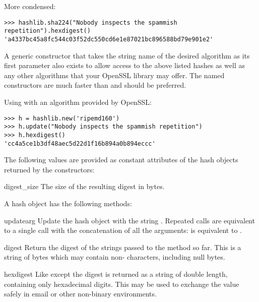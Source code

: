 More condensed:

\begin{verbatim}
>>> hashlib.sha224("Nobody inspects the spammish repetition").hexdigest()
'a4337bc45a8fc544c03f52dc550cd6e1e87021bc896588bd79e901e2'
\end{verbatim}

A generic  constructor that takes the string name of the
desired algorithm as its first parameter also exists to allow access to the
above listed hashes as well as any other algorithms that your OpenSSL library
may offer.  The named constructors are much faster than  and
should be preferred.

Using  with an algorithm provided by OpenSSL:

\begin{verbatim}
>>> h = hashlib.new('ripemd160')
>>> h.update("Nobody inspects the spammish repetition")
>>> h.hexdigest()
'cc4a5ce1b3df48aec5d22d1f16b894a0b894eccc'
\end{verbatim}

The following values are provided as constant attributes of the hash objects
returned by the constructors:

\begin{datadesc}{digest_size}
  The size of the resulting digest in bytes.
\end{datadesc}

A hash object has the following methods:

\begin{methoddesc}[hash]{update}{arg}
Update the hash object with the string .  Repeated calls are
equivalent to a single call with the concatenation of all the
arguments:  is equivalent to
.
\end{methoddesc}

\begin{methoddesc}[hash]{digest}{}
Return the digest of the strings passed to the 
method so far.  This is a string of  bytes which may
contain non-\ASCII{} characters, including null bytes.
\end{methoddesc}

\begin{methoddesc}[hash]{hexdigest}{}
Like  except the digest is returned as a string of
double length, containing only hexadecimal digits.  This may 
be used to exchange the value safely in email or other non-binary
environments.
\end{methoddesc}

